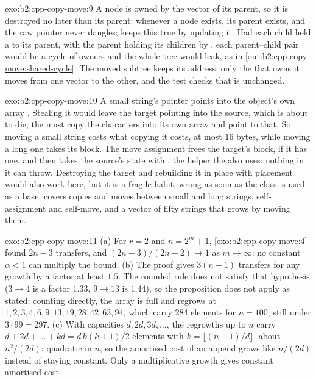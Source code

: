\begin{solution}{exo:b2:cpp-copy-move:9}
A node is owned by the vector of its parent, so it is destroyed no later than its parent: whenever a node exists,
its parent exists, and the raw pointer never dangles;  keeps this true by updating it. Had each child
held a  to its parent, with the parent holding its children by , each
parent--child pair would be a cycle of owners and the whole tree would leak, as in
\cref{out:b2:cpp-copy-move:shared-cycle}. The moved subtree keeps its address: only the  that owns
it moves from one vector to the other, and the test checks that  is unchanged.
\end{solution}

\begin{solution}{exo:b2:cpp-copy-move:10}
A small string's pointer points into the object's own array . Stealing it would leave the target pointing
into the source, which is about to die; the  must copy the characters into its own array and point
to that. So moving a small string costs what copying it costs, at most 16 bytes, while moving a long one takes its
block. The move assignment frees the target's block, if it has one, and then takes the source's state with , the
helper the  also uses: nothing in it can throw. Destroying the target and rebuilding it in place
with placement  would also work here, but it is a fragile habit, wrong as soon as the class is used as a base.  covers copies and moves between small and long strings,
self-assignment and self-move, and a vector of fifty strings that grows by moving them.
\end{solution}

\begin{solution}{exo:b2:cpp-copy-move:11}
(a) For $r = 2$ and $n = 2^m + 1$, \cref{exo:b2:cpp-copy-move:4} found $2n - 3$ transfers, and
$(2n-3)/(2n-2) \to 1$ as $m \to \infty$: no constant $\alpha < 1$ can multiply the bound. (b) The proof gives
$3(n-1)$ transfers for any growth by a factor at least $1.5$. The rounded rule does not satisfy that hypothesis
($3 \to 4$ is a factor $1.33$, $9 \to 13$ is $1.44$), so the proposition does not apply as stated; counting directly,
the array is full and regrows at $1, 2, 3, 4, 6, 9, 13, 19, 28, 42, 63, 94$, which carry 284 elements for $n = 100$,
still under $3 \cdot 99 = 297$. (c) With capacities $d, 2d, 3d, \dots$, the regrowths up to $n$ carry $d + 2d + \dots
+ kd = d\,k(k+1)/2$ elements with $k = \lfloor (n-1)/d \rfloor$, about $n^2/(2d)$: quadratic in $n$, so the amortised
cost of an append grows like $n/(2d)$ instead of staying constant. Only a multiplicative growth gives constant
amortised cost.
\end{solution}

